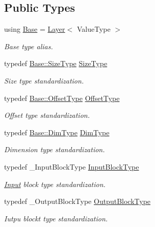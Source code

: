 \subsection*{Public Types}
\begin{DoxyCompactItemize}
\item 
using \hyperlink{classffnn_1_1layer_1_1_hidden_ac51b180aa7de47794148e32616f0441f}{Base} = \hyperlink{classffnn_1_1layer_1_1_layer}{Layer}$<$ Value\-Type $>$
\begin{DoxyCompactList}\small\item\em Base type alias. \end{DoxyCompactList}\item 
typedef \hyperlink{classffnn_1_1layer_1_1_layer_aeccac281d4220fab9cebf78b004c09d1}{Base\-::\-Size\-Type} \hyperlink{classffnn_1_1layer_1_1_hidden_a3deb1dc4b3a83b3d6749474debee025f}{Size\-Type}
\begin{DoxyCompactList}\small\item\em Size type standardization. \end{DoxyCompactList}\item 
typedef \hyperlink{classffnn_1_1layer_1_1_layer_a0e35ffd6e0657856f3a75323b2db9fcb}{Base\-::\-Offset\-Type} \hyperlink{classffnn_1_1layer_1_1_hidden_a4a191bc002b2545231a3d80c99004693}{Offset\-Type}
\begin{DoxyCompactList}\small\item\em Offset type standardization. \end{DoxyCompactList}\item 
typedef \hyperlink{classffnn_1_1layer_1_1_layer_a104a0f51427df4e03f4ac9e1ce7f6083}{Base\-::\-Dim\-Type} \hyperlink{classffnn_1_1layer_1_1_hidden_aba8b203c8b193a53d19fc26c10b14872}{Dim\-Type}
\begin{DoxyCompactList}\small\item\em Dimension type standardization. \end{DoxyCompactList}\item 
typedef \-\_\-\-Input\-Block\-Type \hyperlink{classffnn_1_1layer_1_1_hidden_a01b9cc4df01a7b26423dcd3a0af17b1c}{Input\-Block\-Type}
\begin{DoxyCompactList}\small\item\em \hyperlink{classffnn_1_1layer_1_1_input}{Input} block type standardization. \end{DoxyCompactList}\item 
typedef \-\_\-\-Output\-Block\-Type \hyperlink{classffnn_1_1layer_1_1_hidden_abb03ddc71360cc7ebdab03cd4d1553ee}{Output\-Block\-Type}
\begin{DoxyCompactList}\small\item\em Iutpu blockt type standardization. \end{DoxyCompactList}\end{DoxyCompactItemize}
